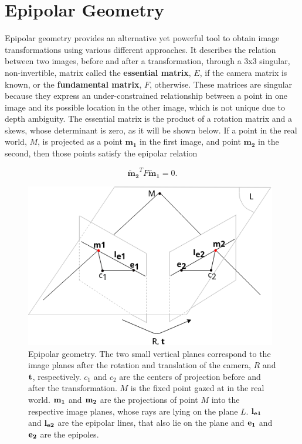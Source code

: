 
\section{Epipolar Geometry}
\label{cha2:epipolar}

Epipolar geometry provides an alternative yet powerful tool to obtain image transformations using various different approaches. It describes the relation between two images, before and after a transformation, through a 3x3 singular, non-invertible, matrix called the \textbf{essential matrix}, \textbf{$E$}, if the camera matrix is known, or the \textbf{fundamental matrix}, \textbf{$F$}, otherwise. These matrices are singular because they express an under-constrained relationship between a point in one image and its possible location in the other image, which is not unique due to depth ambiguity. The essential matrix is the product of a rotation matrix and a \gls{skews}, whose determinant is zero, as it will be shown below. If a point in the real world, $M$, is projected as a point $\mathbf{{m}_1}$ in the first image, and point $\mathbf{{m}_2}$ in the second, then those points satisfy the epipolar relation

\begin{equation}
\label{sec2:eq:epipolar}
\mathbf{\tilde{m}_2}^T F \mathbf{\tilde{m}_1} = 0.
\end{equation}

\begin{figure}[h]
	\centering
	\includegraphics[width=11cm]{images/epipolargeo.png}
	\caption[Epipolar geometry]{Epipolar geometry. The two small vertical planes correspond to the image planes after the rotation and translation of the camera, $R$ and $\bf t$, respectively. $c_1$ and $c_2$ are the centers of projection before and after the transformation. $M$ is the fixed point gazed at in the real world. $\bf m_1$ and $\bf m_2$ are the projections of point $M$ into the respective image planes, whose rays are lying on the plane $L$. $\bf l_{e1}$ and $\bf l_{e2}$ are the epipolar lines, that also lie on the plane and $\bf e_1$ and $\bf e_2$ are the epipoles.}
	\label{sec2:fig:epipolargeo}
\end{figure}

